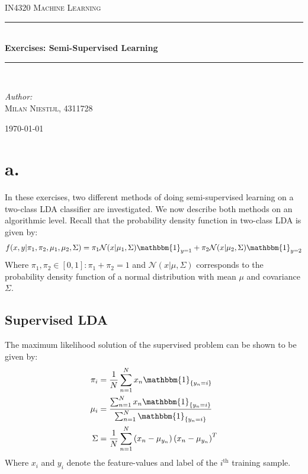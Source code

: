 \documentclass [a4paper] {report}
\begin{document}
	
	\begin{titlepage}
		\begin{center}
			
			\textsc{\LARGE IN4320 Machine Learning}\\[1.25cm]
			
			\rule{\linewidth}{0.5mm}\\[1.0cm]
			{\huge \bfseries Exercises: Semi-Supervised Learning }\\[0.6cm]
			\rule{\linewidth}{0.5mm}\\[1.5cm]
			
			\begin{minipage}{0.4\textwidth}
				\begin{flushleft} \large	
					\emph{Author:}\\
					\textsc{Milan Niestijl, 4311728}
				\end{flushleft}
			\end{minipage}
			
			\vfill
			{\large \today}
		\end{center}
	\end{titlepage}
	
	\section*{a.}
	In these exercises, two different methods of doing semi-supervised learning on a two-class LDA classifier are investigated. We now describe both methods on an algorithmic level. Recall that the probability density function in two-class LDA is given by:
	$$ f(x,y| \pi_{1}, \pi_{2}, \mu_{1},\mu_{2}, \Sigma) = \pi_{1}\mathcal{N}(x|\mu_{1}, \Sigma)\mathbbm{1}_{y=1} + \pi_{2}\mathcal{N}(x|\mu_{2}, \Sigma)\mathbbm{1}_{y=2}$$
	Where $\pi_{1}, \pi_{2} \in [0,1]: \pi_{1} + \pi_{2} =1$ and $\mathcal{N}(x|\mu, \Sigma)$ corresponds to the probability density function of a normal distribution with mean $\mu$ and covariance $\Sigma$.
	\subsection*{Supervised LDA}
	The maximum likelihood solution of the supervised problem can be shown to be given by:
	\begin{align*}
		\pi_{i} &= {1 \over N} \sum_{n=1}^{N}x_{n}\mathbbm{1}_{\{y_{n}=i\}}\\
		\mu_{i} &= \frac{\sum_{n=1}^{N}x_{n}\mathbbm{1}_{\{y_{n}=i\}}}{\sum_{n=1}^{N}\mathbbm{1}_{\{y_{n}=i\}}}\\
		\Sigma &= {1 \over N} \sum_{n=1}^{N} \left( x_{n} - \mu_{y_{n}} \right)\left( x_{n} - \mu_{y_{n}} \right)^{T}
	\end{align*}
	Where $x_{i}$ and $y_{i}$ denote the feature-values and label of the $i^{\text{th}}$ training sample.
\end{document}
